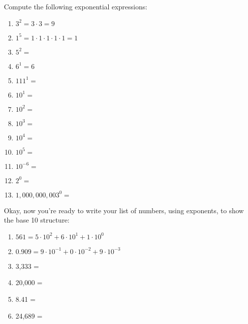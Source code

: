 \documentclass{article}
\begin{document}
\noindent Compute the following exponential expressions:
\begin{enumerate}
\item $3^2 = 3\cdot3=9$
\vspace{0.3in}
\item $1^5=1\cdot1\cdot1\cdot1\cdot1=1$
\vspace{0.3in}
\item $5^2 =$
\vspace{0.3in}
\item $6^1 = 6$
\vspace{0.3in}
\item $111^1=$
\vspace{0.3in}
\item $10^1=$
\vspace{0.3in}
\item $10^2=$
\vspace{0.3in}
\item $10^3=$
\vspace{0.3in}
\item $10^4=$
\vspace{0.3in}
\item $10^5=$
\vspace{0.3in}
\item $10^{-6}=$
\vspace{0.3in}
\item $2^0=$
\vspace{0.3in}
\item $1,000,000,003^0=$
\end{enumerate}

\newpage

\noindent Okay, now you're ready to write your list of numbers, using exponents, to show the base 10 structure:

\vspace{0.2in}

\begin{enumerate}
\item $561=5\cdot10^2 + 6\cdot 10^1 +1\cdot 10^0$
\vspace{0.3in}
\item $0.909=9\cdot10^{-1} + 0\cdot 10^{-2} +9\cdot 10^{-3}$
\vspace{0.3in}
\item 3,333 = 
\vspace{0.3in}
\item 20,000 =
\vspace{0.3in}
\item 8.41 =
\vspace{0.3in}
\item 24,689 =
\end{enumerate}
\end{document}
